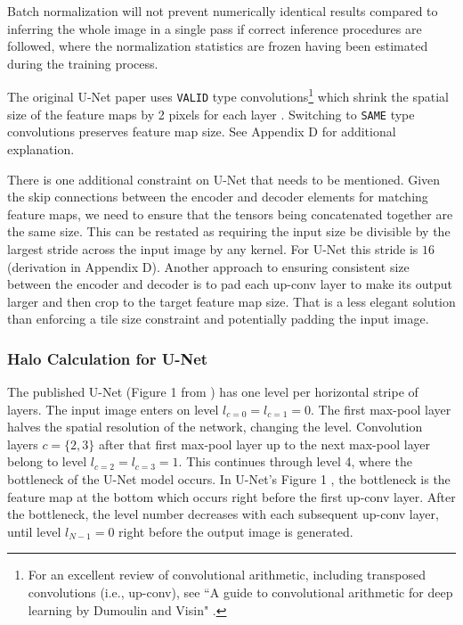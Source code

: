 \documentclass[10pt, indentfirst]{article}
\begin{document}
Batch normalization will not prevent numerically identical results compared to inferring the whole image in a single pass if correct inference procedures are followed, where the normalization statistics are frozen having been estimated during the training process.

The original U-Net paper uses \texttt{VALID} type convolutions\footnote{For an excellent review of convolutional arithmetic, including transposed convolutions (i.e., up-conv), see ``A guide to convolutional arithmetic for deep learning by Dumoulin and Visin" \citep{Dumoulin2018}.} which shrink the spatial size of the feature maps by 2 pixels for each layer \citep{Dumoulin2018}. Switching to \texttt{SAME} type convolutions preserves feature map size. See Appendix D for additional explanation. 

There is one additional constraint on U-Net that needs to be mentioned. Given the skip connections between the encoder and decoder elements for matching feature maps, we need to ensure that the tensors being concatenated together are the same size. This can be restated as requiring the input size be divisible by the largest stride across the input image by any kernel. For U-Net this stride is $16$ (derivation in Appendix D). Another approach to ensuring consistent size between the encoder and decoder is to pad each up-conv layer to make its output larger and then crop to the target feature map size. That is a less elegant solution than enforcing a tile size constraint and potentially padding the input image.


\subsubsection{Halo Calculation for U-Net}

The published U-Net (Figure 1 from \citep{Ronneberger2015a}) has one level per horizontal stripe of layers. The input image enters on level $l_{c=0} = l_{c=1} = 0$. The first max-pool layer halves the spatial resolution of the network, changing the level. Convolution layers $c = \{2, 3\}$ after that first max-pool layer up to the next max-pool layer belong to level $l_{c=2}=l_{c=3} = 1$. This continues through level 4, where the bottleneck of the U-Net model occurs. In U-Net's Figure 1 \citep{Ronneberger2015a}, the bottleneck is the feature map at the bottom which occurs right before the first up-conv layer. After the bottleneck, the level number decreases with each subsequent up-conv layer, until level $l_{N-1} = 0$ right before the output image is generated. 
\end{document}
